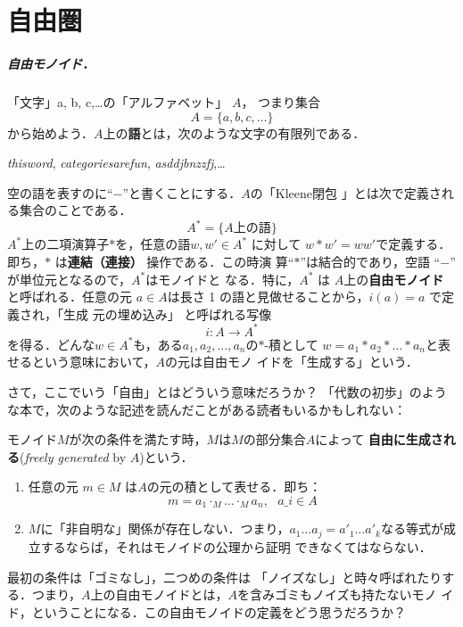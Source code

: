 \section{自由圏}
\label{sec:free categories}
\subparagraph{自由モノイド．}
 「文字」a, b, c,\ldots の「アルファベット」 $A$，
 つまり集合
 \[
 A = \{a, b, c,\ldots\}
 \]
 から始めよう．$A$上の{\bfseries 語}とは，次のような文字の有限列である．
 \begin{center}
 {\itshape thisword}, {\itshape categoriesarefun}, {\itshape asddjbnzzfj},\ldots
 \end{center}
 空の語を表すのに``$-$''と書くことにする．$A$の「Kleene閉包
 」とは次で定義される集合のことである．
 \[
 A^* = \{A\text{上の語}\}
 \]
 $A^*$上の二項演算子$*$を，任意の語$w, w' \in A^*$ に対して $w * w' =
 ww'$で定義する．即ち，$*$ は{\bfseries 連結（連接）}
 操作である．この時演
 算``$*$''は結合的であり，空語 ``$-$'' が単位元となるので，$A^*$はモノイドと
 なる．特に，$A^*$ は $A$上の{\bfseries 自由モノイド}
 と呼ばれる．任意の元
 $a \in A$は長さ 1 の語と見做せることから，$i(a) = a$ で定義され，「生成
 元の埋め込み」
 と呼ばれる写像
 \[
 i: A \to A^\ast
 \]
 を得る．どんな$w \in A^\ast$も，ある$a_1, a_2,\ldots,a_n$の$*$-積として $w
 = a_1 * a_2 * \ldots * a_n$と表せるという意味において，$A$の元は自由モノ
 イドを「生成する」という．

さて，ここでいう「自由」とはどういう意味だろうか？
「代数の初歩」のような本で，次のような記述を読んだことがある読者もいるかもしれない：

モノイド$M$が次の条件を満たす時，$M$は$M$の部分集合$A$によって{\bfseries
自由に生成される}({\itshape freely generated} by $A$)という．
\begin{enumerate}
 \item 任意の元 $m \in M$ は$A$の元の積として表せる．即ち：
       \[
	m = a_1 \cdot_M \ldots \cdot_M a_n,\ \ \ a\_i \in A
       \]
 \item $M$に「非自明な」関係が存在しない．つまり，$a_1 \ldots a_j = a'_1
       \ldots a'_k$なる等式が成立するならば，それはモノイドの公理から証明
       できなくてはならない．
\end{enumerate}
最初の条件は「ゴミなし」，二つめの条件は
「ノイズなし」と時々呼ばれたりす
る．つまり，$A$上の自由モノイドとは，$A$を含みゴミもノイズも持たないモノ
イド，ということになる．この自由モノイドの定義をどう思うだろうか？

